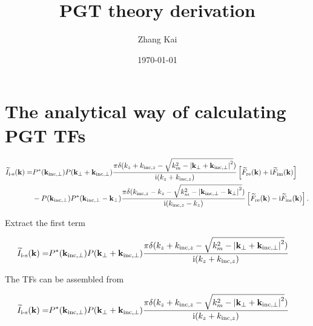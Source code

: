 \documentclass{mynotes}
\begin{document}
\title{PGT theory derivation}
\author{Zhang Kai}
\date{\today}

\tableofcontents

\maketitle

\section{The analytical way of calculating PGT TFs}

\begin{equation}
	\begin{aligned}
		\widetilde{I}_{\text{i-s}}(\mathbf{k})
		= & P^*(\mathbf{k_{\text{inc}, \perp}})P(\mathbf{k}_{\perp}+\mathbf{k}_{\text{inc}, \perp})
		\frac{\pi \delta(k_z + k_{\text{inc}, z} - \sqrt{k_m^2 - \abs{\mathbf{k}_{\perp}+\mathbf{k}_{\text{inc}, \perp}}^2})}
		{\mathrm{i} (k_z+k_{\text{inc},z})}
		\left[\widetilde{F}_{\text{re}}(\mathbf{k}) + \mathrm{i}\widetilde{F}_{\text{im}}(\mathbf{k})\right]  \\
		  & -P(\mathbf{k_{\text{inc}, \perp}})P^*(\mathbf{k_{\text{inc}, \perp}}-\mathbf{k_{\perp}})
		\frac{\pi \delta(k_{\text{inc}, z} - k_z - \sqrt{k_m^2 - \abs{\mathbf{k}_{\text{inc}, \perp}-\mathbf{k}_{\perp}}^2})}
		{\mathrm{i} (k_{\text{inc}, z} - k_z)}
		\left[\widetilde{F}_{\text{re}}(\mathbf{k}) - \mathrm{i}\widetilde{F}_{\text{im}}(\mathbf{k})\right]. \\
	\end{aligned}
\end{equation}

Extract the first term

\begin{equation}
	\begin{aligned}
		\widetilde{I}_{\text{i-s}}(\mathbf{k})
		= & P^*(\mathbf{k_{\text{inc}, \perp}})P(\mathbf{k}_{\perp}+\mathbf{k}_{\text{inc}, \perp})
		\frac{\pi \delta(k_z + k_{\text{inc}, z} - \sqrt{k_m^2 - \abs{\mathbf{k}_{\perp}+\mathbf{k}_{\text{inc}, \perp}}^2})}
		{\mathrm{i} (k_z+k_{\text{inc},z})}
	\end{aligned}
\end{equation}

The TFs can be assembled from

\begin{equation}
	\begin{aligned}
		\widetilde{I}_{\text{i-s}}(\mathbf{k})
		= & P^*(\mathbf{k_{\text{inc}, \perp}})P(\mathbf{k}_{\perp}+\mathbf{k}_{\text{inc}, \perp})
		\frac{\pi \delta(k_z + k_{\text{inc}, z} - \sqrt{k_m^2 - \abs{\mathbf{k}_{\perp}+\mathbf{k}_{\text{inc}, \perp}}^2})}
		{\mathrm{i} (k_z+k_{\text{inc},z})}
	\end{aligned}
\end{equation}
\end{document}
